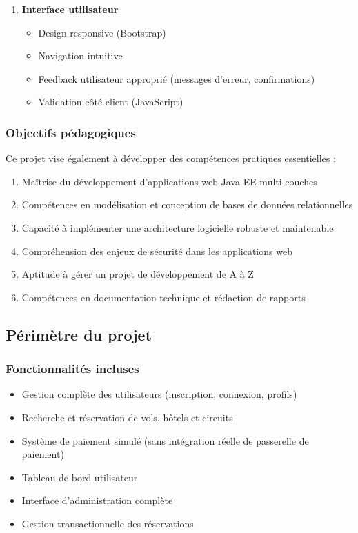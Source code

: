 \documentclass[12pt,a4paper]{report}
\begin{document}
\begin{enumerate}
    \item \textbf{Interface utilisateur}
    \begin{itemize}
        \item Design responsive (Bootstrap)
        \item Navigation intuitive
        \item Feedback utilisateur approprié (messages d'erreur, confirmations)
        \item Validation côté client (JavaScript)
    \end{itemize}
\end{enumerate}

\subsubsection{Objectifs pédagogiques}

Ce projet vise également à développer des compétences pratiques essentielles :

\begin{enumerate}
    \item Maîtrise du développement d'applications web Java EE multi-couches
    \item Compétences en modélisation et conception de bases de données relationnelles
    \item Capacité à implémenter une architecture logicielle robuste et maintenable
    \item Compréhension des enjeux de sécurité dans les applications web
    \item Aptitude à gérer un projet de développement de A à Z
    \item Compétences en documentation technique et rédaction de rapports
\end{enumerate}

\subsection{Périmètre du projet}

\subsubsection{Fonctionnalités incluses}

\begin{itemize}
    \item Gestion complète des utilisateurs (inscription, connexion, profils)
    \item Recherche et réservation de vols, hôtels et circuits
    \item Système de paiement simulé (sans intégration réelle de passerelle de paiement)
    \item Tableau de bord utilisateur
    \item Interface d'administration complète
    \item Gestion transactionnelle des réservations
\end{itemize}
\end{document}
